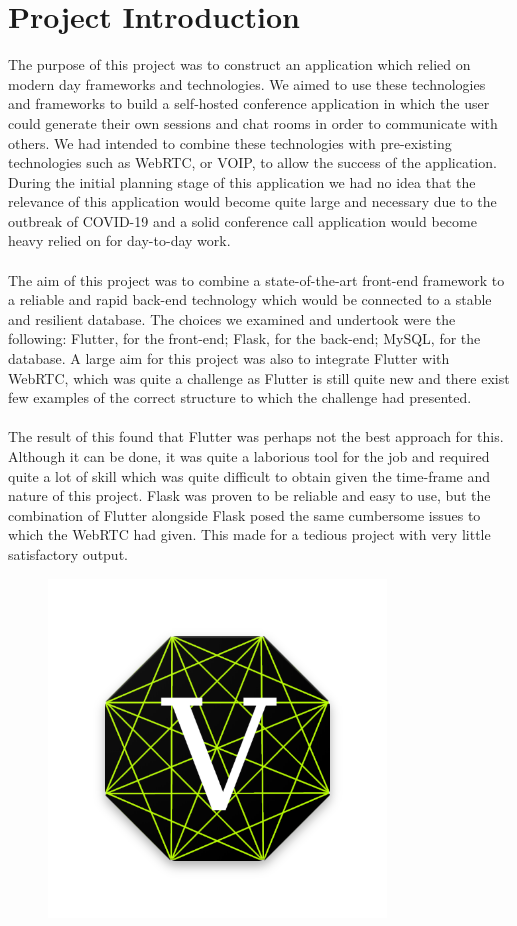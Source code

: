 \section{Project Introduction}
The purpose of this project was to construct an application which relied on modern day frameworks and technologies. We aimed to use these technologies and frameworks to build a self-hosted conference application in which the user could generate their own sessions and chat rooms in order to communicate with others. We had intended to combine these technologies with pre-existing technologies such as WebRTC, or VOIP, to allow the success of the application. During the initial planning stage of this application we had no idea that the relevance of this application would become quite large and necessary due to the outbreak of COVID-19 and a solid conference call application would become heavy relied on for day-to-day work.
\\\\ The aim of this project was to combine a state-of-the-art front-end framework to a reliable and rapid back-end technology which would be connected to a stable and resilient database. The choices we examined and undertook were the following: Flutter, for the front-end; Flask, for the back-end; MySQL, for the database. A large aim for this project was also to integrate Flutter with WebRTC, which was quite a challenge as Flutter is still quite new and there exist few examples of the correct structure to which the challenge had presented.
\\\\ The result of this found that Flutter was perhaps not the best approach for this. Although it can be done, it was quite a laborious tool for the job and required quite a lot of skill which was quite difficult to obtain given the time-frame and nature of this project. Flask was proven to be reliable and easy to use, but the combination of Flutter alongside Flask posed the same cumbersome issues to which the WebRTC had given. This made for a tedious project with very little satisfactory output. 
\begin{figure}[h!]
    \label{image:vertexChatLogo}
    \centering
    \includegraphics[width=0.8\textwidth]{images/vertexChatLogo.png}
\end{figure}